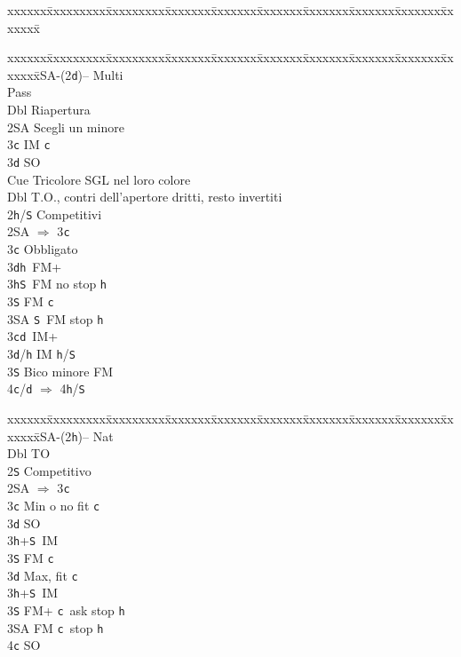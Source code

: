 \documentclass[a4paper,italian]{article}
\newcommand{\BS}{\small{\texttt{S}}}
\newcommand{\BC}{\small{\texttt{c}}}
\newcommand{\BD}{\small{\texttt{d}}}
\newcommand{\BH}{\small{\texttt{h}}}
\newenvironment{bidtable}
{\begin{tabbing}

    xxxxxx\=xxxxxxxxx\=xxxxxxxxx\=xxxxxxx\=xxxxxxx\=xxxxxxx\=xxxxxxx\=xxxxxxx\=xxxxxxx\=xxxxxxx\=\kill}
{\end{tabbing} }%
\begin{document}
\begin{multicols}{2}
\begin{bidtable}
    \end{bidtable}
    \begin{bidtable}
        1\small{SA}-(2\BD)-- \>\> Multi\+\\
        Pass\+\\
        Dbl \> Riapertura\\
        2\small{SA} \> Scegli un minore\\
        3\BC \> IM \BC \\
        3\BD \> SO\\
        Cue \> Tricolore SGL nel loro colore\-\\
        Dbl \> T.O., contri dell'apertore dritti, resto invertiti\\
        2\BH/\BS \> Competitivi\\
        2\small{SA} \> $\Rightarrow$ 3\BC \+\\
        3\BC \> Obbligato\+\\
        3\BD {}\BH\ FM+\\
        3\BH {}\BS\ FM no stop \BH \\
        3\BS \> FM \BC \\
        3\small{SA} \BS\ FM stop \BH \-\-\\
        3\BC {}\BD\ IM+\\
        3\BD/\BH \> IM \BH /\BS \\
        3\BS \> Bico minore FM\\
        4\BC/\BD \> $\Rightarrow$ 4\BH /\BS \-
    \end{bidtable}
    \vfill\null
    \columnbreak
    \begin{bidtable}
        1\small{SA}-(2\BH)--\> \> Nat\+\\
        Dbl \> TO\\
        2\BS \> Competitivo\\
        2\small{SA} \> $\Rightarrow$ 3\BC \+\\
        3\BC \> Min o no fit \BC\+\\
        3\BD \> SO\\
        3\BH {}+\BS\ IM\\
        3\BS \> FM \BC \-\\
        3\BD \> Max, fit \BC \+\\
        3\BH {}+\BS\ IM\\
        3\BS \> FM+ \BC\ ask stop \BH \\
        3\small{SA} \> FM \BC\ stop \BH \\
        4\BC \> SO\-\-\\

\end{bidtable}
\end{multicols}
\end{document}
